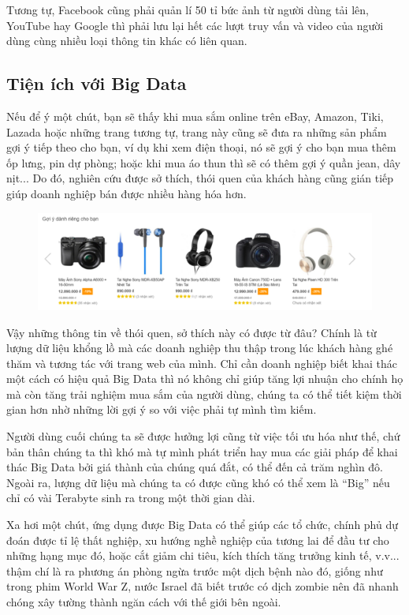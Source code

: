 \documentclass[12pt]{report}
\begin{document}
Tương tự, Facebook cũng phải quản lí 50 tỉ bức ảnh từ người dùng tải lên, YouTube hay Google thì phải lưu lại hết các lượt truy vấn và video của người dùng cùng nhiều loại thông tin khác có liên quan.

\subsection{Tiện ích với Big Data}
Nếu để ý một chút, bạn sẽ thấy khi mua sắm online trên eBay, Amazon, Tiki, Lazada hoặc những trang tương tự, trang này cũng sẽ đưa ra những sản phẩm gợi ý tiếp theo cho bạn, ví dụ khi xem điện thoại, nó sẽ gợi ý cho bạn mua thêm ốp lưng, pin dự phòng; hoặc khi mua áo thun thì sẽ có thêm gợi ý quần jean, dây nịt... Do đó, nghiên cứu được sở thích, thói quen của khách hàng cũng gián tiếp giúp doanh nghiệp bán được nhiều hàng hóa hơn.

\begin{figure}[H]
\centering
\includegraphics[scale=1]{ebay.png}
\end{figure}

Vậy những thông tin về thói quen, sở thích này có được từ đâu? Chính là từ lượng dữ liệu khổng lồ mà các doanh nghiệp thu thập trong lúc khách hàng ghé thăm và tương tác với trang web của mình. Chỉ cần doanh nghiệp biết khai thác một cách có hiệu quả Big Data thì nó không chỉ giúp tăng lợi nhuận cho chính họ mà còn tăng trải nghiệm mua sắm của người dùng, chúng ta có thể tiết kiệm thời gian hơn nhờ những lời gợi ý so với việc phải tự mình tìm kiếm.

Người dùng cuối chúng ta sẽ được hưởng lợi cũng từ việc tối ưu hóa như thế, chứ bản thân chúng ta thì khó mà tự mình phát triển hay mua các giải pháp để khai thác Big Data bởi giá thành của chúng quá đắt, có thể đến cả trăm nghìn đô. Ngoài ra, lượng dữ liệu mà chúng ta có được cũng khó có thể xem là “Big” nếu chỉ có vài Terabyte sinh ra trong một thời gian dài.

Xa hơi một chút, ứng dụng được Big Data có thể giúp các tổ chức, chính phủ dự đoán được tỉ lệ thất nghiệp, xu hướng nghề nghiệp của tương lai để đầu tư cho những hạng mục đó, hoặc cắt giảm chi tiêu, kích thích tăng trưởng kinh tế, v.v... thậm chí là ra phương án phòng ngừa trước một dịch bệnh nào đó, giống như trong phim World War Z, nước Israel đã biết trước có dịch zombie nên đã nhanh chóng xây tường thành ngăn cách với thế giới bên ngoài.
\end{document}
